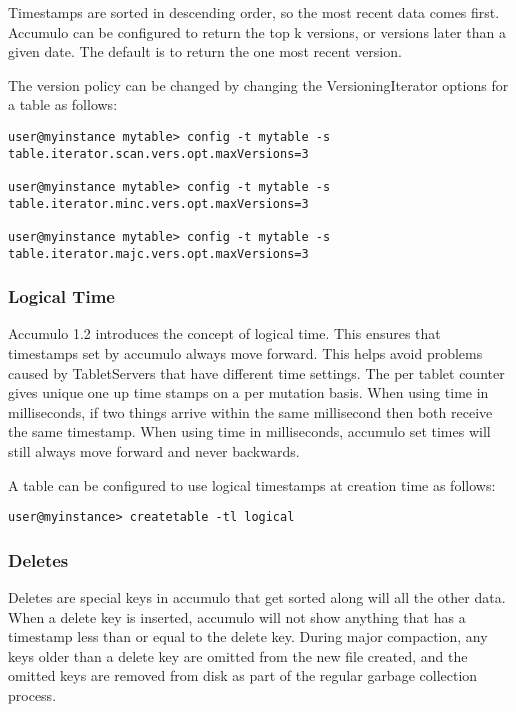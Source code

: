 Timestamps are sorted in descending order, so the most recent data comes first.
Accumulo can be configured to return the top k versions, or versions later than a
given date. The default is to return the one most recent version.

The version policy can be changed by changing the VersioningIterator options for a
table as follows:

\small
\begin{verbatim}
user@myinstance mytable> config -t mytable -s
table.iterator.scan.vers.opt.maxVersions=3

user@myinstance mytable> config -t mytable -s
table.iterator.minc.vers.opt.maxVersions=3

user@myinstance mytable> config -t mytable -s
table.iterator.majc.vers.opt.maxVersions=3
\end{verbatim}
\normalsize

\subsubsection{Logical Time}

Accumulo 1.2 introduces the concept of logical time. This ensures that timestamps
set by accumulo always move forward. This helps avoid problems caused by
TabletServers that have different time settings. The per tablet counter gives unique
one up time stamps on a per mutation basis. When using time in milliseconds, if
two things arrive within the same millisecond then both receive the same
timestamp.  When using time in milliseconds, accumulo set times will still
always move forward and never backwards.

A table can be configured to use logical timestamps at creation time as follows:

\small
\begin{verbatim}
user@myinstance> createtable -tl logical
\end{verbatim}
\normalsize

\subsubsection{Deletes}
Deletes are special keys in accumulo that get sorted along will all the other data.
When a delete key is inserted, accumulo will not show anything that has a
timestamp less than or equal to the delete key. During major compaction, any keys
older than a delete key are omitted from the new file created, and the omitted keys
are removed from disk as part of the regular garbage collection process.

